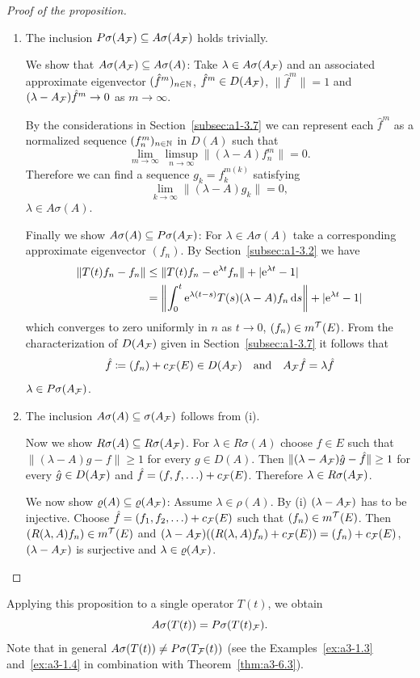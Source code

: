 \begin{proof}[Proof of the proposition]
\begin{enumerate}[\upshape (i), wide, labelindent=.25em]
\item 
The inclusion $P\sigma(A_{\mathcal{F}}) \subseteq A\sigma(A_{\mathcal{F}})$ holds trivially.

We show that $A\sigma(A_{\mathcal{F}}) \subseteq A\sigma(A)$: Take $\lambda \in A\sigma(A_{\mathcal{F}})$ and an associated approximate eigenvector $({\hat{f}^{m}})_{n \in \mathbb{N}}$, \ie $\hat{f}^{m} \in D(A_{\mathcal{F}})$, $\|\hat{f}^{m}\| = 1$ and $(\lambda-A_{\mathcal{F}})\hat{f}^{m} \to 0$ as $m \to \infty$.

By the considerations in Section~\ref{subsec:a1-3.7} we can represent each $\hat{f}^{m}$ as a normalized sequence $(f_{n}^{m})_{n \in \mathbb{N}}$ in $D(A)$ such that
\[
\lim_{m \to \infty} \limsup_{n \to \infty} \|(\lambda-A)f_{n}^{m}\| = 0 .
\]
Therefore we can find a sequence $g_{k} = f_{k}^{m(k)}$ satisfying
\[
\lim_{k \to \infty} \|(\lambda-A)g_{k}\| = 0 ,
\]
\ie $\lambda \in A\sigma(A)$.

Finally we show $A\sigma(A) \subseteq P\sigma(A_{\mathcal{F}})$: For $\lambda \in A\sigma(A)$ take a corresponding approximate eigenvector $(f_{n})$.
By Section~\ref{subsec:a1-3.2} we have
\begin{align*}
\|T(t)f_{n} - f_{n}\| &\leq \|T(t)f_{n} - \eu^{\lambda t}f_{n}\| + |\eu^{\lambda t} - 1| \\
&= \left\|\int_{0}^{t} \eu^{\lambda(t-s)}T(s)(\lambda-A)f_{n} \ds\right\| + |\eu^{\lambda t} - 1|
\end{align*}
which converges to zero uniformly in $n$ as $t \to 0$, \ie $(f_{n}) \in m^{\mathcal{T}}(E)$.
From the characterization of\/ $D(A_{\mathcal{F}})$ given in Section~\ref{subsec:a1-3.7} it follows that
\[
	\hat{f} \coloneq (f_{n}) + c_{\mathcal{F}}(E) \in D(A_{\mathcal{F}})
	\quad \text{and} \quad
	A_{\mathcal{F}}\hat{f} = \lambda\hat{f}
\]
\ie  $\lambda \in P\sigma(A_{\mathcal{F}}) $.

\item 
The inclusion $A\sigma(A) \subseteq \sigma(A_{\mathcal{F}})$ follows from (i). 

Now we show $R\sigma(A) \subseteq R\sigma(A_{\mathcal{F}})$.
For $\lambda \in R\sigma(A)$ choose $f \in E$ such that $\|(\lambda-A)g - f\| \geq 1$ for every $g \in D(A)$.
Then $\|(\lambda-A_{\F})\hat{g} - \hat{f}\| \geq 1$ for every $\hat{g} \in D(A_{\mathcal{F}})$ and $\hat{f} = (f,f,\ldots) + c_{\mathcal{F}}(E)$.
Therefore $\lambda \in R\sigma(A_{\mathcal{F}})$.

We now show $\rho(A) \subseteq \rho(A_{\F})$: Assume $\lambda \in \rho(A)$.
By (i) $(\lambda-A_{\mathcal{F}})$ has to be injective.
Choose $\hat{f} = (f_{1},f_{2},\ldots) + c_{\mathcal{F}}(E)$ such that $(f_{n}) \in m^{\mathcal{T}}(E)$.
Then $(R(\lambda,A)f_{n}) \in m^{\mathcal{T}}(E)$ and $(\lambda-A_{\mathcal{F}})((R(\lambda,A)f_{n})+c_{\mathcal{F}}(E)) = (f_{n}) + c_{\mathcal{F}}(E)$, \ie $(\lambda-A_{\mathcal{F}})$ is surjective and $\lambda \in \rho(A_{\F})$.
\qedhere
\end{enumerate}
\end{proof}
Applying this proposition to a single operator $T(t)$, we obtain
\[
A\sigma(T(t)) = P\sigma(T(t)_{\mathcal{F}}) .
\]
Note that in general $A\sigma(T(t)) \neq P\sigma(T_{\mathcal{F}}(t))$ (see the Examples~\ref{ex:a3-1.3} and~\ref{ex:a3-1.4} in combination with Theorem~\ref{thm:a3-6.3}).

